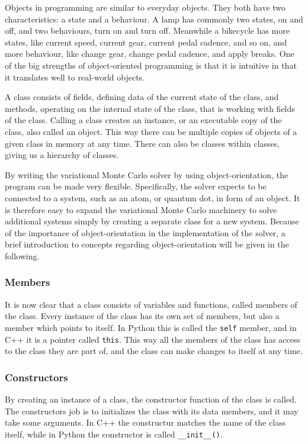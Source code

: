 	Objects in programming are similar to everyday objects. They both have two characteristics: a state and a behaviour. A lamp has commonly two states, on and off, and two behaviours, turn on and turn off. Meanwhile a bikecycle has more states, like current speed, current gear, current pedal cadence, and so on, and more behaviour, like change gear, change pedal cadence, and apply breaks. One of the big strengths of object-oriented programming is that it is intuitive in that it translates well to real-world objects.

	A class consists of fields, defining data of the current state of the class, and methods, operating on the internal state of the class, that is working with fields of the class. Calling a class creates an instance, or an executable copy of the class, also called an object. This way there can be multiple copies of objects of a given class in memory at any time. There can also be classes within classes, giving us a hierarchy of classes.

	By writing the variational Monte Carlo solver by using object-orientation, the program can be made very flexible. Specifically, the solver expects to be connected to a system, such as an atom, or quantum dot, in form of an object. It is therefore easy to expand the variational Monte Carlo machinery to solve additional systems simply by creating a separate class for a new system. Because of the importance of object-orientation in the implementation of the solver, a brief introduction to concepts regarding object-orientation will be given in the following.

	\subsubsection{Members}
		It is now clear that a class consists of variables and functions, called members of the class. Every instance of the class has its own set of members, but also a member which points to itself. In Python this is called the {\tt self} member, and in C++ it is a pointer called {\tt this}. This way all the members of the class has access to the class they are part of, and the class can make changes to itself at any time. 
	\subsubsection{Constructors}
		By creating an instance of a class, the constructor function of the class is called. The constructors job is to initializes the class with its data members, and it may take some arguments. In C++ the constructur matches the name of the class itself, while in Python the constructor is called {\tt \_\_init\_\_()}. 

